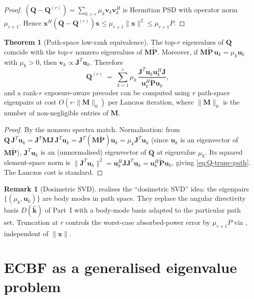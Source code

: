 \documentclass[11pt,a4paper]{article}
\theoremstyle{definition}
\newtheorem{theorem}{Theorem}[section]
\newtheorem{remark}[remark]{Remark}
\newcommand{\khat}{\hat{\bm{k}}}
\newcommand{\Jmat}{\mathbf{J}}                 %
\newcommand{\Mmat}{\mathbf{M}}                 %
\newcommand{\Qmat}{\mathbf{Q}}                 %
\newcommand{\Pmat}{\tilde{\mathbf{P}}}         %
\newcommand{\xx}{\mathbf{x}}
\newcommand{\vv}{\mathbf{v}}
\newcommand{\uu}{\mathbf{u}}
\begin{document}
\begin{proof}
$(\Qmat-\Qmat^{(r)})=\sum_{k>r}\mu_k\vv_k\vv_k^H$ is Hermitian PSD with
operator norm $\mu_{r+1}$.  Hence
$\xx^H(\Qmat-\Qmat^{(r)})\xx\le\mu_{r+1}\|\xx\|^2\le\mu_{r+1}P$.
\end{proof}

\begin{theorem}[Path-space low-rank equivalence]\label{thm:lowrank-path}
The top-$r$ eigenvalues of $\Qmat$ coincide with the top-$r$ nonzero
eigenvalues of $\Mmat\Pmat$.  Moreover, if $\Mmat\Pmat\,\uu_k=\mu_k\uu_k$
with $\mu_k>0$, then $\vv_k\propto\Jmat^T\uu_k$.  Therefore
\begin{equation}\label{eq:Q-trunc-path}
  \Qmat^{(r)}\;=\;\sum_{k=1}^{r}\mu_k\,
  \frac{\Jmat^T\uu_k\uu_k^H\Jmat}{\uu_k^H\Pmat\uu_k},
\end{equation}
and a rank-$r$ exposure-aware precoder can be computed using $r$
path-space eigenpairs at cost $O(r\cdot\|\Mmat\|_0)$ per Lanczos
iteration, where $\|\Mmat\|_0$ is the number of non-negligible entries of
$\Mmat$.
\end{theorem}

\begin{proof}
By  the nonzero spectra match.  Normalisation: from
$\Qmat\,\Jmat^T\uu_k=\Jmat^T\Mmat\Jmat\,\Jmat^T\uu_k=\Jmat^T(\Mmat\Pmat)\uu_k
=\mu_k\Jmat^T\uu_k$ (since $\uu_k$ is an eigenvector of $\Mmat\Pmat$),
$\Jmat^T\uu_k$ is an (unnormalised) eigenvector of $\Qmat$ at eigenvalue
$\mu_k$.  Its squared element-space norm is
$\|\Jmat^T\uu_k\|^2=\uu_k^H\Jmat\Jmat^T\uu_k=\uu_k^H\Pmat\uu_k$, giving
\eqref{eq:Q-trunc-path}.  The Lanczos cost is standard.
\end{proof}

\begin{remark}[Dosimetric SVD]\label{rem:svd}
 realises the ``dosimetric SVD'' idea: the
eigenpairs $\{(\mu_k,\uu_k)\}$ are body modes in path space.  They replace
the angular directivity basis $D(\khat)$ of Part~I with a body-mode basis
adapted to the particular path set.  Truncation at $r$ controls the
worst-case absorbed-power error by $\mu_{r+1}P$ via ,
independent of $\|\xx\|$.
\end{remark}

\section{ECBF as a generalised eigenvalue problem}\label{sec:gep}
\end{document}

